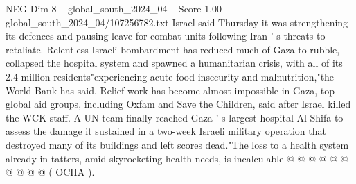 \begin{textsample}{NEG Dim 8 – global\_south\_2024\_04 – Score 1.00 – global\_south\_2024\_04/107256782.txt}
Israel said Thursday it was strengthening its defences and pausing leave for combat units following Iran ' s threats to retaliate.
Relentless Israeli bombardment has reduced much of Gaza to rubble, collapsed the hospital system and spawned a humanitarian crisis, with all of its 2.4 million residents"experiencing acute food insecurity and malnutrition,"the World Bank has said.
Relief work has become almost impossible in Gaza, top global aid groups, including Oxfam and Save the Children, said after Israel killed the WCK staff.
A UN team finally reached Gaza ' s largest hospital Al-Shifa to assess the damage it sustained in a two-week Israeli military operation that destroyed many of its buildings and left scores dead."The loss to a health system already in tatters, amid skyrocketing health needs, is incalculable @ @ @ @ @ @ @ @ @ @ ( OCHA ).

\end{textsample}
